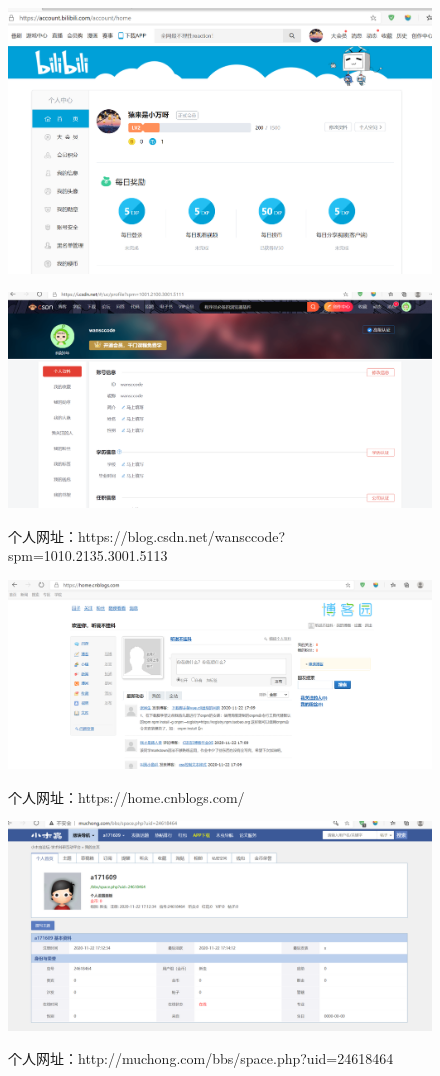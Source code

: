 \documentclass{article}
\begin{document}
    \begin{figure}[H]
    	\centering
    	\includegraphics[width=0.7\linewidth]{B站}
    	\caption{}
    	\label{fig:b}
    \end{figure}
    
    \begin{figure}[H]
    	\centering
    	\includegraphics[width=0.7\linewidth]{CSDN}
    	\caption{}
    	\label{fig:csdn}
    	个人网址：https://blog.csdn.net/wansccode?spm=1010.2135.3001.5113
    \end{figure}
    
    
    \begin{figure}[H]
    	\centering
    	\includegraphics[width=0.7\linewidth]{博客园}
    	\caption{}
    	\label{fig:}
    	个人网址：https://home.cnblogs.com/
    \end{figure}
    
    
    \begin{figure}[H]
    	\centering
    	\includegraphics[width=0.7\linewidth]{小木虫}
    	\caption{}
    	\label{fig:}
    	个人网址：http://muchong.com/bbs/space.php?uid=24618464
    \end{figure}
    
    



\hspace*{\fill} \\



\end{document}
